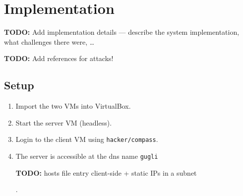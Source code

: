 \documentclass[a4paper]{article}
\newcommand{\TODO}[1]{\begin{center}\large\textbf{TODO:} #1\end{center}}
\begin{document}
\section{Implementation}

\TODO{Add implementation details --- describe the system implementation, what challenges there were, \ldots}
\TODO{Add references for attacks!}

\subsection{Setup}

\begin{enumerate}
    \item Import the two VMs into VirtualBox.
    \item Start the server VM (headless).
    \item Login to the client VM using \texttt{hacker/compass}.
    \item The server is accessible at the dns name \texttt{gugli} \TODO{hosts file entry client-side + static IPs in a subnet}.
\end{enumerate}
\end{document}
